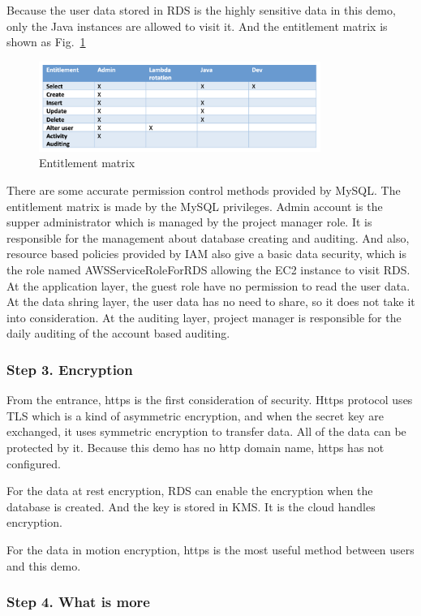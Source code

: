 \documentclass[conference]{IEEEtran}
\begin{document}
Because the user data stored in RDS is the highly sensitive data in this demo, only the Java instances are allowed to visit it. And the entitlement matrix 
is shown as Fig.~\ref{matrix}

\begin{figure}[htbp]
    \centerline{\includegraphics[width=260pt]{images/matrix.png}}
    \caption{Entitlement matrix}
    \label{matrix}
\end{figure}

There are some accurate permission control methods provided by MySQL. The entitlement matrix is made by the MySQL privileges. Admin account is the supper administrator 
which is managed by the project manager role. It is responsible for the management about database creating and auditing. And also, resource based policies provided 
by IAM also give a basic data security, which is the role named AWSServiceRoleForRDS allowing the EC2 instance to visit RDS. At the application layer, the guest role 
have no permission to read the user data. At the data shring layer, the user data has no need to share, so it does not take it into consideration. At the auditing layer, 
project manager is responsible for the daily auditing of the account based auditing.

\subsubsection{Step 3. Encryption}

From the entrance, https is the first consideration of security. Https protocol uses TLS which is a kind of asymmetric encryption, and when the secret key are exchanged, 
it uses symmetric encryption to transfer data. All of the data can be protected by it. Because this demo has no http domain name, https has not configured.

For the data at rest encryption, RDS can enable the encryption when the database is created. And the key is stored in KMS. It is the cloud handles encryption.

For the data in motion encryption, https is the most useful method between users and this demo.

\subsubsection{Step 4. What is more}
\end{document}
